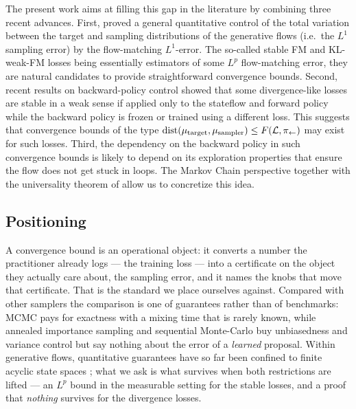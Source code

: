 The present work aims at filling this gap in the literature by combining three recent advances. First,  \citet{brunswicEGF} proved a general quantitative
control of the total variation between the target and sampling distributions of the generative flows (i.e.\ the $L^1$ sampling error) by the flow-matching $L^1$-error.
The so-called stable FM \cite{brunswic2024theory} and KL-weak-FM \cite{brunswicEGF} losses being essentially estimators of some $L^p$ flow-matching error, they are natural candidates to provide straightforward convergence bounds.
Second, recent results on backward-policy control \cite{gritsaev2024optimizing,morozov2025revisiting} showed that some divergence-like losses are stable in a weak sense if applied only to the stateflow and forward policy
while the backward policy is frozen or trained using a different loss. This suggests that convergence bounds of the type $\mathrm{dist}(\mu_{\mathrm{target}}, \mu_{\mathrm{sampler}}) \leq F(\mathcal L, \pi_{\leftarrow})$
may exist for such losses. Third, the dependency on the backward policy in such convergence bounds is likely to depend on its exploration properties that ensure the flow does not get stuck in loops.
The Markov Chain perspective \cite{deleu2023generative} together with the universality theorem of \citet{brunswicEGF} allow us to concretize this idea.


\subsection{Positioning}\label{sub:positioning}

A convergence bound is an operational object: it converts a number the practitioner already
logs --- the training loss --- into a certificate on the object they actually care about, the
sampling error, and it names the knobs that move that certificate. That is the standard we
place ourselves against. Compared with other samplers the comparison is one of guarantees
rather than of benchmarks: MCMC pays for exactness with a mixing time that is rarely known,
while annealed importance sampling and sequential Monte-Carlo buy unbiasedness and variance
control but say nothing about the error of a \emph{learned} proposal. Within generative flows,
quantitative guarantees have so far been confined to finite acyclic state spaces
\cite{silvageneralization,silva2025gflownets}; what we ask is what survives when both
restrictions are lifted --- an $L^p$ bound in the measurable setting for the stable losses,
and a proof that \emph{nothing} survives for the divergence losses.

